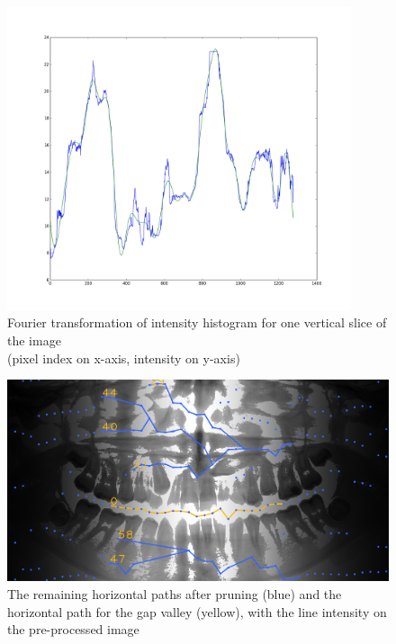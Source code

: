 \documentclass[a4paper,10pt]{article}
\begin{document}
\begin{figure}[htbp]
	\centering
	\includegraphics[width=0.9\textwidth, trim=0cm 2.5cm 0cm 3cm, clip]{fourier_intensity}
	\caption{Fourier transformation of intensity histogram for one vertical slice of the image \\(pixel index on x-axis, intensity on y-axis)}
	\label{fig:fourier}
\end{figure}

\begin{figure}[htbp]
	\centering
	\includegraphics[width=1\textwidth, trim=0cm 0cm 0cm 0cm, clip]{paths}
	\caption{The remaining horizontal paths after pruning (blue) and the horizontal path for the gap valley (yellow), with the line intensity on the pre-processed image}
	\label{fig:paths}
\end{figure}


\clearpage
\end{document}
